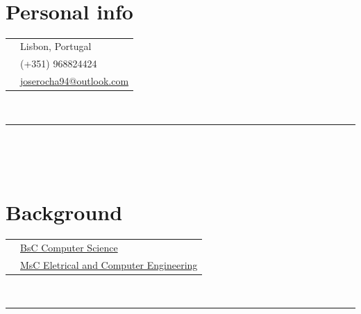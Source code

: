 \documentclass[oneside]{article}
\begin{document}
{\begin{minipage}[t][\textheight-2\fboxsep-2\fboxrule][t]{\dimexpr0.4\textwidth-2\fboxrule-2\fboxsep\relax}
        \vspace{0.3 cm} \\
        \section*{\normalsize Personal info}
        \begin{tabularx}{\textwidth}{cY}
            \faMapMarker{} & \small  Lisbon, Portugal \\
            \faPhone{} & \small  (+351) 968824424 \\
            \faEnvelope{} & \small \href{mailto:joserocha94@outlook.com}{joserocha94@outlook.com} \\
        \end{tabularx}
        \vspace{0.5cm} \\
        \rule{\linewidth}{0.4pt} \\

        \vspace{0.3 cm} \\
        \section*{\normalsize Background}
        \begin{tabular}{cl}
            \faUniversity{} & \small \href{https://www.uevora.pt/}{BsC Computer Science} \\
            \faUniversity{} & \small \href{https://tecnico.ulisboa.pt/pt/}{MsC Eletrical and Computer Engineering}\\ 
        \end{tabular}
        \vspace{0.5cm} \\
        \rule{\linewidth}{0.4pt} \\

        \vspace{0.3 cm} \\

\end{minipage}}
\end{document}
